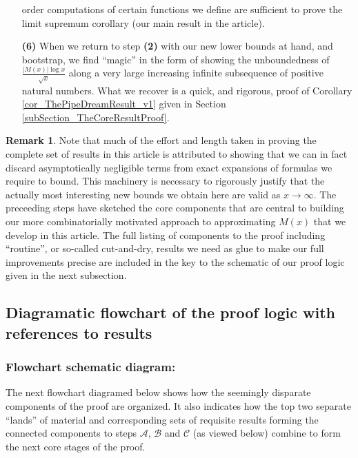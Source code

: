 \documentclass[11pt,reqno,a4letter]{article}
\numberwithin{figure}{section}
\numberwithin{table}{section}
\theoremstyle{plain}
\numberwithin{theorem}{section}
\theoremstyle{definition}
\newtheorem{remark}[theorem]{Remark}
\begin{document}
\begin{itemize}
           order computations of certain functions we define are sufficient to prove the limit supremum corollary 
           (our main result in the article). 
\item[\textbf{(6)}] When we return to step \textbf{(2)} 
           with our new lower bounds at hand, and bootstrap, we find ``magic'' in the form of 
           showing the unboundedness of $\frac{|M(x)| \log x}{\sqrt{x}}$ 
           along a very large increasing infinite subsequence 
           of positive natural numbers. What we recover is a quick, and rigorous, proof of 
           Corollary \ref{cor_ThePipeDreamResult_v1} given in 
           Section \ref{subSection_TheCoreResultProof}. 
           
\end{itemize} 

\begin{remark}
Note that much of the effort and length taken in proving the complete set of results in this article is 
attributed to showing that we can in fact discard asymptotically negligible terms from exact expansions  
of formulas we require to bound. This machinery is necessary to rigorously justify that the actually most 
interesting new bounds we obtain here are valid as $x \rightarrow \infty$. The preceeding steps have sketched 
the core components that are central to building our more combinatorially motivated approach to approximating 
$M(x)$ that we develop in this article. The full listing of components to the proof including 
``routine'', or so-called cut-and-dry, results we need as glue 
to make our full improvements precise are included in the key to the schematic of our proof logic given in the next 
subsection.
\end{remark} 

\subsection{Diagramatic flowchart of the proof logic with references to results} 

\subsubsection*{Flowchart schematic diagram: } 

The next flowchart diagramed below shows how the seemingly disparate components of the proof are organized. 
It also indicates how the top two separate ``lands'' of material and corresponding sets of requisite results 
forming the connected components to steps $\mathcal{A}$, $\mathcal{B}$ and $\mathcal{C}$ (as viewed below) 
combine to form the next core stages of the proof. 
\end{document}
